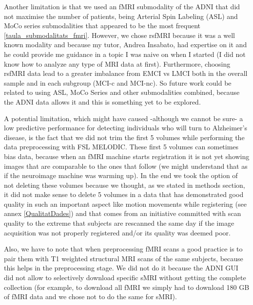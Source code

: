 \documentclass[a4paper,12pt]{elsarticle}  %
\begin{document}
	Another limitation is that we used an fMRI submodality of the ADNI that did not maximise the number of patients, being Arterial Spin Labeling (ASL) and MoCo series submodalities that appeared to be the most frequent \ref{taula_submodalitats_fmri}. However, we chose rsfMRI because it was a well known modality and because my tutor, Andrea Insabato, had expertise on it and he could provide me guidance in a topic I was naive on when I started (I did not know how to analyze any type of MRI data at first). Furthermore, choosing rsfMRI data lead to a greater imbalance from EMCI vs LMCI both in the overall sample and in each subgroup (MCI-c and MCI-nc). So future work could be related to using ASL, MoCo Series and other submodalities combined, because the ADNI data allows it and this is something yet to be explored.
	
	
	A potential limitation, which might have caused -although we cannot be sure- a low predictive performance for detecting individuals who will turn to Alzheimer's disease, is the fact that we did not trim the first 5 volumes while performing the data preprocessing with FSL MELODIC. These first 5 volumes can sometimes bias data, because when an fMRI machine starts registration it is not yet showing images that are comparable to the ones that follow (we might understand that as if the neuroimage machine was warming up). In the end we took the option of not deleting these volumes because we thought, as we stated in methods section, it did not make sense to delete 5 volumes in a data that has demonstrated good quality in such an important aspect like motion movements while registering (see annex \ref{QualitatDades}) and that comes from an initiative committed with scan quality to the extreme that subjects are rescanned the same day if the image acquisition was not properly registered and/or its quality was deemed poor.
	
	Also, we have to note that when preprocessing fMRI scans a good practice is to pair them with T1 weighted structural MRI scans of the same subjects, because this helps in the preprocessing stage. We did not do it because the ADNI GUI did not allow to selectively download specific sMRI without getting the complete collection (for example, to download all fMRI we simply had to download 180 GB of fMRI data and we chose not to do the same for sMRI).
	
\end{document}
